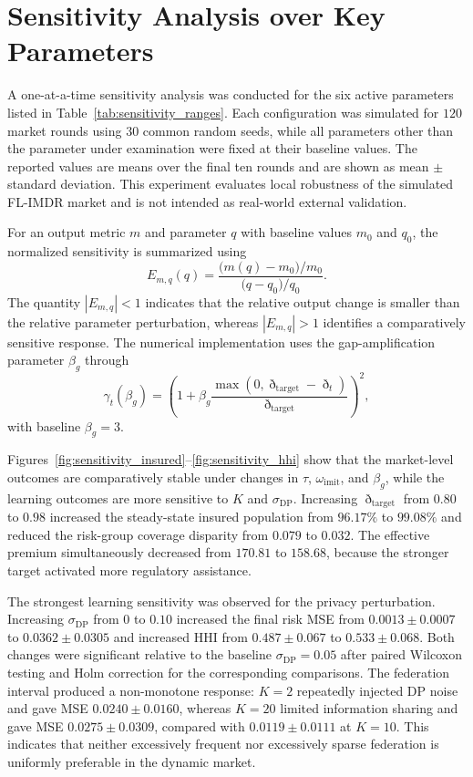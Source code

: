 \section{Sensitivity Analysis over Key Parameters}
\label{app:sensitivity}

A one-at-a-time sensitivity analysis was conducted for the six active parameters listed in Table~\ref{tab:sensitivity_ranges}. Each configuration was simulated for $120$ market rounds using $30$ common random seeds, while all parameters other than the parameter under examination were fixed at their baseline values. The reported values are means over the final ten rounds and are shown as mean $\pm$ standard deviation. This experiment evaluates local robustness of the simulated FL-IMDR market and is not intended as real-world external validation.

For an output metric $m$ and parameter $q$ with baseline values $m_0$ and $q_0$, the normalized sensitivity is summarized using
\begin{equation}
\label{eq:sensitivity_elasticity}
E_{m,q}(q)=
\frac{\bigl(m(q)-m_0\bigr)/m_0}
     {\bigl(q-q_0\bigr)/q_0}.
\end{equation}
The quantity $|E_{m,q}|<1$ indicates that the relative output change is smaller than the relative parameter perturbation, whereas $|E_{m,q}|>1$ identifies a comparatively sensitive response. The numerical implementation uses the gap-amplification parameter $\beta_g$ through
\begin{equation}
\gamma_t(\beta_g)=
\left(1+\beta_g
\frac{\max(0,\eth_{\mathrm{target}}-\eth_t)}
     {\eth_{\mathrm{target}}}\right)^2,
\end{equation}
with baseline $\beta_g=3$.



Figures~\ref{fig:sensitivity_insured}--\ref{fig:sensitivity_hhi} show that the market-level outcomes are comparatively stable under changes in $\tau$, $\omega_{\mathrm{imit}}$, and $\beta_g$, while the learning outcomes are more sensitive to $K$ and $\sigma_{\mathrm{DP}}$. Increasing $\eth_{\mathrm{target}}$ from $0.80$ to $0.98$ increased the steady-state insured population from $96.17\%$ to $99.08\%$ and reduced the risk-group coverage disparity from $0.079$ to $0.032$. The effective premium simultaneously decreased from $170.81$ to $158.68$, because the stronger target activated more regulatory assistance.

The strongest learning sensitivity was observed for the privacy perturbation. Increasing $\sigma_{\mathrm{DP}}$ from $0$ to $0.10$ increased the final risk MSE from $0.0013\pm0.0007$ to $0.0362\pm0.0305$ and increased HHI from $0.487\pm0.067$ to $0.533\pm0.068$. Both changes were significant relative to the baseline $\sigma_{\mathrm{DP}}=0.05$ after paired Wilcoxon testing and Holm correction for the corresponding comparisons. The federation interval produced a non-monotone response: $K=2$ repeatedly injected DP noise and gave MSE $0.0240\pm0.0160$, whereas $K=20$ limited information sharing and gave MSE $0.0275\pm0.0309$, compared with $0.0119\pm0.0111$ at $K=10$. This indicates that neither excessively frequent nor excessively sparse federation is uniformly preferable in the dynamic market.

